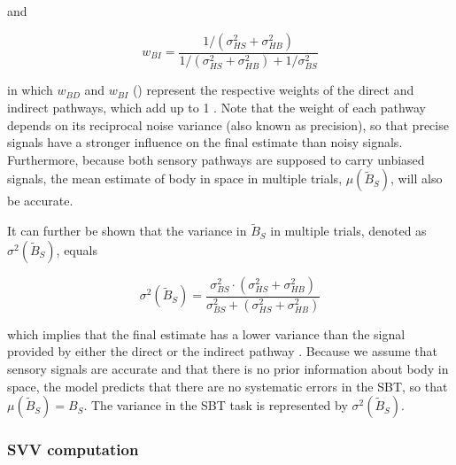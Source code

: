 and

\begin{equation}
\label{p1:eqn4}
w_{BI} = \frac{1/(\sigma^2_{HS} + \sigma^2_{HB})}{1/(\sigma^2_{HS} + \sigma^2_{HB}) + 1/\sigma^2_{BS}}
\end{equation}

in which $w_{BD}$ and $w_{BI}$ () represent the respective weights of the direct and indirect pathways, which add up to 1 \cite{landy1995,jacobs1999,ernst2002,bays2007}. Note that the weight of each pathway depends on its reciprocal noise variance (also known as precision), so that precise signals have a stronger influence on the final estimate than noisy signals. Furthermore, because both sensory pathways are supposed to carry unbiased signals, the mean estimate of body in space in multiple trials, $\mu(\tilde{B}_S)$, will also be accurate. 

It can further be shown that the variance in $\tilde{B}_S$ in multiple trials, denoted as $\sigma^2(\tilde{B}_S)$, equals 

\begin{equation}
\label{p1:eqn5}
\sigma^2(\tilde{B}_S) = \frac{
\sigma^2_{BS} \cdot (\sigma^2_{HS} + \sigma^2_{HB})
}{
\sigma^2_{BS} + (\sigma^2_{HS} + \sigma^2_{HB})
}
\end{equation}

which implies that the final estimate has a lower variance than the signal provided by either the direct or the indirect pathway \cite{ernst2002,ernst2004}. Because we assume that sensory signals are accurate and that there is no prior information about body in space, the model predicts that there are no systematic errors in the SBT, so that $\mu(\tilde{B}_S) = B_S$. The variance in the SBT task is represented by $\sigma^2(\tilde{B}_S)$. 

\subsubsection{SVV computation}


